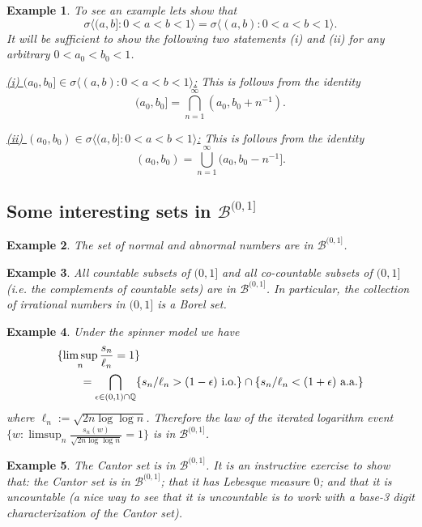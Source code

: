 \documentclass[10pt,letterpaper,twocolumn]{article}
\newtheorem{example}{Example}
\begin{document}
\begin{example}
To see an example lets show that 
\[ \sigma\bigl\langle (a,b]: 0< a < b < 1 \bigr\rangle =\sigma\bigl\langle (a,b): 0< a < b <1  \bigr\rangle.\] 
It will be sufficient to show the following two statements (i) and (ii) for any arbitrary $0<a_0<b_0<1$.

\noindent
\underline{(i) $(a_0,b_0]\in \sigma\langle (a,b):0<a<b<1\rangle$:}
This is follows from the identity
\[(a_0,b_0] = \bigcap_{n=1}^\infty (a_0,b_0+n^{-1} ).  \]


\noindent
\underline{(ii) $(a_0,b_0)\in \sigma\langle (a,b]:0<a<b<1\rangle$:}
This is follows from the identity
\[(a_0,b_0) = \bigcup_{n=1}^\infty (a_0,b_0-n^{-1}  ].  \]

\end{example}


\subsection{Some interesting sets in $\mathcal B^{(0,1]}$}

\begin{example}
The set of normal and abnormal numbers are in $\mathcal B^{(0,1]}$.
\end{example}

\begin{example}
All countable subsets of $(0,1]$ and  all co-countable subsets of $(0,1]$ (i.e. the complements of countable sets) are in $\mathcal B^{(0,1]}$. In particular, the collection of  irrational numbers in $(0,1]$ is a Borel set.
\end{example}


\begin{example}
Under the spinner model we have
 \begin{align*}
 &\{ \limsup_n \frac{s_n}{\ell_n}=1  \}\\
 &\qquad=\bigcap_{\epsilon\in (0,1)\cap \Bbb Q} \{ {s_n/\ell_n}> (1-\epsilon) \text{  i.o.} \}\cap \{ {s_n/\ell_n}< (1+\epsilon) \text{  a.a.} \}
 \end{align*}
 where $\ell_n:=\sqrt{2n\log\log n}$.
 Therefore the law of the iterated logarithm event $\{w: \limsup_n \frac{s_n(w)}{\sqrt{2n\log\log n}}=1  \}$ is in $\mathcal B^{(0,1]}$.
\end{example}


\begin{example}
The Cantor set is in $\mathcal B^{(0,1]}$.  It is an instructive exercise to show that: the Cantor set is in $\mathcal B^{(0,1]}$;  that it has Lebesque measure $0$; and that it is uncountable (a nice way to see that it is uncountable is to work with a base-3 digit characterization of the Cantor set).
\end{example}
\end{document}
